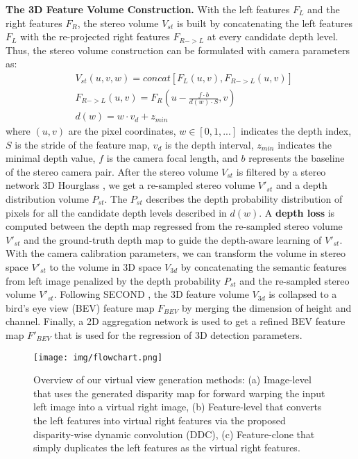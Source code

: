 \documentclass[10pt,twocolumn,letterpaper]{article}
\begin{document}
\textbf{The 3D Feature Volume Construction. }
With the left features $F_L$ and the right features $F_R$, the stereo volume $V_{st}$ is built by concatenating the left features $F_L$ with the re-projected right features $F_{R->L}$ at every candidate depth level. Thus, the stereo volume construction can be formulated with camera parameters as:
\begin{eqnarray}
&V_{st}(u,v,w) = concat[F_L(u,v), F_{R->L}(u, v)]\\
&F_{R->L}(u, v) = F_R(u - \frac{f \cdot b}{d(w)\cdot S}, v)\\
&d(w)=w \cdot v_d + z_{min}
\end{eqnarray}
where $(u,v)$ are the pixel coordinates, $w \in [0, 1, ...]$ indicates the depth index, $S$ is the stride of the feature map, $v_d$ is the depth interval, $z_{min}$ indicates the minimal depth value, $f$ is the camera focal length, and $b$ represents the baseline of the stereo camera pair. 
After the stereo volume $V_{st}$ is filtered by a stereo network 3D Hourglass \cite{guo2021liga}, we get a re-sampled stereo volume $V'_{st}$ and a depth distribution volume $P_{st}$. The $P_{st}$ describes the depth probability distribution of pixels for all the candidate depth levels described in $d(w)$. A \textbf{depth loss} is computed between the depth map regressed from the re-sampled stereo volume $V'_{st}$ and the ground-truth depth map to guide the depth-aware learning of $V'_{st}$. With the camera calibration parameters, we can transform the volume in stereo space $V'_{st}$ to the volume in 3D space $V_{3d}$ by concatenating the semantic features from left image penalized by the depth probability $P_{st}$ and the re-sampled stereo volume $V'_{st}$. 
Following SECOND \cite{yan2018second}, the 3D feature volume $V_{3d}$ is collapsed to a bird's eye view (BEV) feature map $F_{BEV}$ by merging the dimension of height and channel. Finally, a 2D aggregation network is used to get a refined BEV feature map $F'_{BEV}$ that is used for the regression of 3D detection parameters.

\begin{figure*}[t!]
  \centering
 \texttt{[image: img/flowchart.png]}
\vspace{-6mm}
  \caption{ Overview of our virtual view generation methods: (a) Image-level that uses the generated disparity map for forward warping the input left image into a virtual right image, (b) Feature-level that converts the left features into virtual right features via the proposed disparity-wise dynamic convolution (DDC), (c) Feature-clone that simply duplicates the left features as the virtual right features.
} 
 \label{fig:overview}
\vspace{-3mm}
\end{figure*} 
\end{document}
